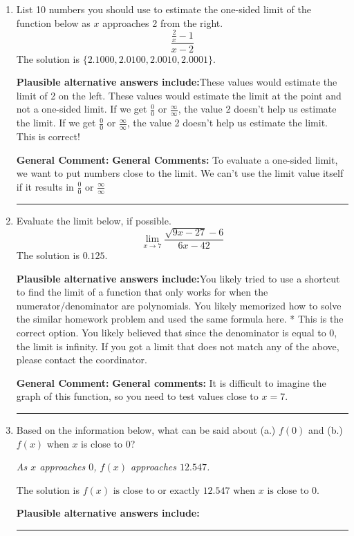 \documentclass{extbook}[14pt]
\newcommand{\litem}[1]{\item #1

\rule{\textwidth}{0.4pt}}
\begin{document}
\begin{enumerate}\litem{
List 10 numbers you should use to estimate the one-sided limit of the function below as $x$ approaches 2 from the right.
\[ \frac{\frac{2}{x} - 1}{x - 2} \]The solution is \( \{ 2.1000, 2.0100, 2.0010, 2.0001 \} \).\begin{enumerate}[label=\Alph*.]
\textbf{Plausible alternative answers include:}These values would estimate the limit of 2 on the left.
These values would estimate the limit at the point and not a one-sided limit.
If we get $\frac{0}{0}$ or $\frac{\infty}{\infty}$, the value 2 doesn't help us estimate the limit.
If we get $\frac{0}{0}$ or $\frac{\infty}{\infty}$, the value 2 doesn't help us estimate the limit.
This is correct!
\end{enumerate}

\textbf{General Comment:} \textbf{General Comments:} To evaluate a one-sided limit, we want to put numbers close to the limit. We can't use the limit value itself if it results in $\frac{0}{0}$ or $\frac{\infty}{\infty}$
}
\litem{
Evaluate the limit below, if possible.
\[ \lim_{x \rightarrow 7} \frac{\sqrt{9x - 27} - 6}{6x - 42} \]The solution is \( 0.125 \).\begin{enumerate}[label=\Alph*.]
\textbf{Plausible alternative answers include:}You likely tried to use a shortcut to find the limit of a function that only works for when the numerator/denominator are polynomials.
You likely memorized how to solve the similar homework problem and used the same formula here.
* This is the correct option.
You likely believed that since the denominator is equal to 0, the limit is infinity.
If you got a limit that does not match any of the above, please contact the coordinator.
\end{enumerate}

\textbf{General Comment:} \textbf{General comments:} It is difficult to imagine the graph of this function, so you need to test values close to $x = 7$.
}
\litem{
Based on the information below, what can be said about (a.) $f(0)$ and (b.) $f(x)$ when $x$ is close to $0$?

\begin{center}
    \textit{ As $x$ approaches $0$, $f(x)$ approaches $12.547$. }
\end{center}
The solution is \( f(x) \text{ is close to or exactly } 12.547 \text{ when } x \text{ is close to } 0 \).\begin{enumerate}[label=\Alph*.]
\textbf{Plausible alternative answers include:}





\end{enumerate}}
\end{enumerate}
\end{document}
